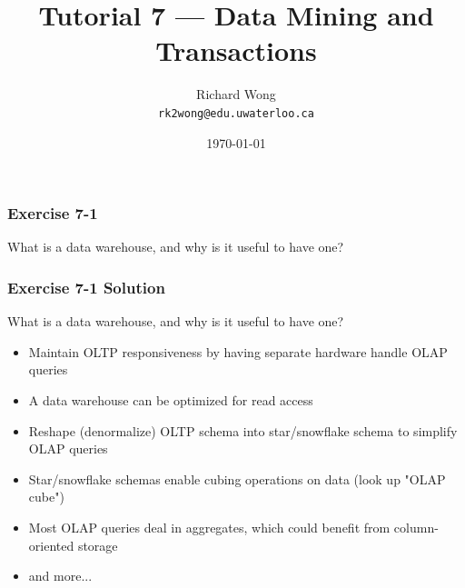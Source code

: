 

\def\ojoin{\setbox0=\hbox{$\bowtie$}%
  \rule[-.02ex]{.25em}{.4pt}\llap{\rule[\ht0]{.25em}{.4pt}}}
\def\leftouterjoin{\mathbin{\ojoin\mkern-5.8mu\bowtie}}

\title{Tutorial 7 --- Data Mining and Transactions }

\author{Richard Wong \\ \small \texttt{rk2wong@edu.uwaterloo.ca}}
\date{\today}




\begin{frame}
  \titlepage

\end{frame}


\begin{frame}
\frametitle{Exercise 7-1}

What is a data warehouse, and why is it useful to have one?

\end{frame}


\begin{frame}
\frametitle{Exercise 7-1 Solution}

What is a data warehouse, and why is it useful to have one?

\begin{itemize}
  \item Maintain OLTP responsiveness by having separate hardware handle OLAP queries
  \item A data warehouse can be optimized for read access
  \item Reshape (denormalize) OLTP schema into star/snowflake schema to simplify OLAP queries
  \item Star/snowflake schemas enable cubing operations on data (look up "OLAP cube")
  \item Most OLAP queries deal in aggregates, which could benefit from column-oriented storage
  \item and more...
\end{itemize}

\end{frame}


